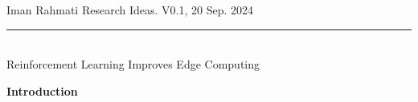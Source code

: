 \documentclass[12pt]{article}
\newcommand{\soptitle}{Reinforcement Learning Improves Edge Computing}
\newcommand{\yourname}{Iman Rahmati}
\begin{document}
	

	
%


\begin{center} 
	
		\vspace{-17mm}
	
	\large Iman Rahmati  \hfill Research Ideas. V0.1, 20 Sep. 2024 \vspace{1mm} \hrule
	
	\vspace{-1mm}
	
	\textcolor{white}{i} \\ \LARGE\soptitle \vspace{6mm}\\
\end{center}
	



\vspace{-8mm}

\begin{abstract}
	\vspace{-2mm}
	\noindent
	Mobile edge computing often suffers from the dynamic and unknown nature of the environment such as time-varying conditions, heterogeneous devices, and frequent communication requests, imposing significant challenges on improving system performance. To meet the rapidly growing demands of computation-intensive and time-sensitive applications, Reinforcement learning \cite{mnih2015human} has been proposed as an effective tool to establish low-latency and energy-efficient networks. RL enables network entities to interact with the environment and learn an optimal decision-making policy, usually modeled as a Markov decision process \cite{puterman2014markov}.
\end{abstract}



	
\vspace{4mm}

\noindent\large\textbf{Introduction}

\vspace{1.5mm}
\normalsize
\end{document}
